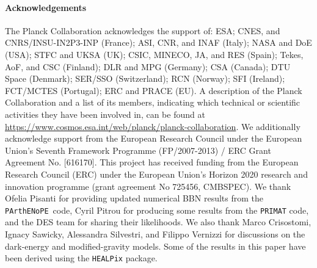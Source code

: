 \documentclass[longauth,traditabstract]{aa}
\newcommand{\parthenope}{{\tt PArthENoPE}}
\begin{document}
\paragraph{Acknowledgements}
The Planck Collaboration acknowledges the support of: ESA; CNES, and
CNRS/INSU-IN2P3-INP (France); ASI, CNR, and INAF (Italy); NASA and DoE
(USA); STFC and UKSA (UK); CSIC, MINECO, JA, and RES (Spain); Tekes, AoF,
and CSC (Finland); DLR and MPG (Germany); CSA (Canada); DTU Space
(Denmark); SER/SSO (Switzerland); RCN (Norway); SFI (Ireland);
FCT/MCTES (Portugal); ERC and PRACE (EU). A description of the Planck
Collaboration and a list of its members, indicating which technical
or scientific activities they have been involved in, can be found at
\href{https://www.cosmos.esa.int/web/planck/planck-collaboration}{https://www.cosmos.esa.int/web/planck/planck-collaboration}.
We additionally acknowledge support from the European Research Council under
the European Union's Seventh Framework Programme (FP/2007-2013) / ERC Grant Agreement No. [616170]. This project has received funding from the European Research Council (ERC) under the European Union’s
Horizon 2020 research and innovation programme (grant agreement No 725456, CMBSPEC).
We thank Ofelia Pisanti for providing updated numerical BBN results from the \parthenope\ code, Cyril Pitrou for producing some results from the {\tt PRIMAT} code, and the DES
team for sharing their likelihoods. We also thank Marco Crisostomi, Ignacy Sawicky, Alessandra Silvestri, and Filippo Vernizzi for discussions on the dark-energy and modified-gravity models.
Some of the results in this paper have been derived using the {\tt HEALPix}
package.


\end{document}
